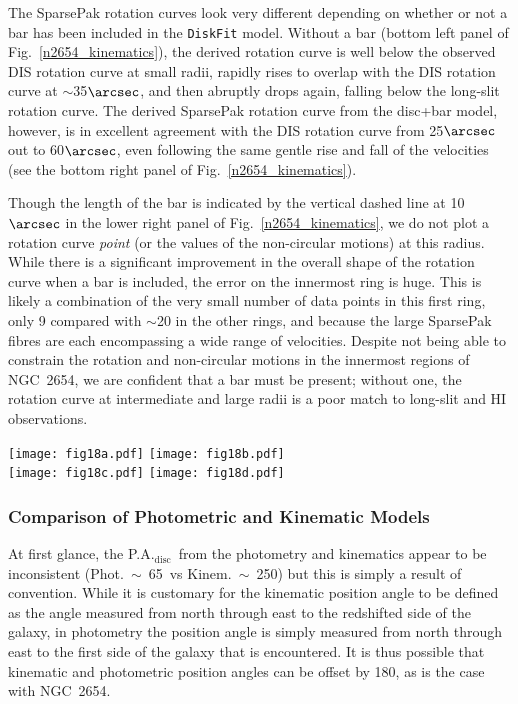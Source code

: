 \documentclass[a4paper,fleqn,usenatbib]{mnras}
\begin{document}
The SparsePak rotation curves look very different depending on whether or not a bar has been included in the \texttt{DiskFit} model.  Without a bar (bottom left panel of Fig.~\ref{n2654_kinematics}), the derived rotation curve is well below the observed DIS rotation curve at small radii, rapidly rises to overlap with the DIS rotation curve at $\sim$35$\arcsec$, and then abruptly drops again, falling below the long-slit rotation curve.  The derived SparsePak rotation curve from the disc+bar model, however, is in excellent agreement with the DIS rotation curve from 25$\arcsec$ out to 60$\arcsec$, even following the same gentle rise and fall of the velocities (see the bottom right panel of Fig.~\ref{n2654_kinematics}).

Though the length of the bar is indicated by the vertical dashed line at 10$\arcsec$ in the lower right panel of Fig.~\ref{n2654_kinematics}, we do not plot a rotation curve \textit{point} (or the values of the non-circular motions) at this radius.  While there is a significant improvement in the overall shape of the rotation curve when a bar is included, the error on the innermost ring is huge.  This is likely a combination of the very small number of data points in this first ring, only 9 compared with $\sim$20 in the other rings, and because the large SparsePak fibres are each encompassing a wide range of velocities.  Despite not being able to constrain the rotation and non-circular motions in the innermost regions of NGC~2654, we are confident that a bar must be present; without one, the rotation curve at intermediate and large radii is a poor match to long-slit and HI observations.

\begin{figure*}
	\center
    	\hskip 10mm \texttt{[image: fig18a.pdf]} \hskip 2mm \texttt{[image: fig18b.pdf]}\\
	\hskip 2mm
    	\texttt{[image: fig18c.pdf]} \hskip 2mm \texttt{[image: fig18d.pdf]}
  	\caption{Same as Fig.~\ref{n6674_kinematics} but for NGC~2654.}
  	\label{n2654_kinematics}
\end{figure*}

\subsubsection{Comparison of Photometric and Kinematic Models}
\label{sec:n2654compare}

At first glance, the P.A.$_{\mathrm{disc}}$\ from the photometry and kinematics appear to be inconsistent (Phot.~$\sim$~65\degr\ vs Kinem.~$\sim$~250\degr) but this is simply a result of convention. While it is customary for the kinematic position angle to be defined as the angle measured from north through east to the redshifted side of the galaxy, in photometry the position angle is simply measured from north through east to the first side of the galaxy that is encountered.  It is thus possible that kinematic and photometric position angles can be offset by 180\degr, as is the case with NGC~2654. 
\end{document}

